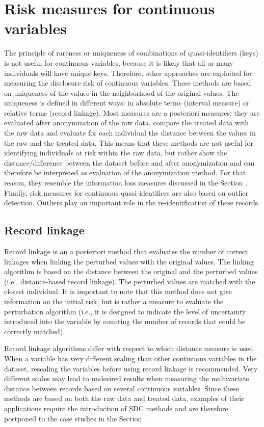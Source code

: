 \documentclass[letterpaper,10pt,english]{sphinxmanual}
\begin{document}
\section{Risk measures for continuous variables}
\label{\detokenize{measure_risk:risk-measures-for-continuous-variables}}
The principle of rareness or uniqueness of combinations of
quasi-identifiers (keys) is not useful for continuous variables, because
it is likely that all or many individuals will have unique keys.
Therefore, other approaches are exploited for measuring the disclosure
risk of continuous variables. These methods are based on uniqueness of
the values in the neighborhood of the original values. The uniqueness is
defined in different ways: in absolute terms (interval measure) or
relative terms (record linkage). Most measures are a posteriori
measures: they are evaluated after anonymization of the raw data,
compare the treated data with the raw data and evaluate for each
individual the distance between the values in the raw and the treated
data. This means that these methods are not useful for identifying
individuals at risk within the raw data, but rather show the
distance/difference between the dataset before and after anonymization
and can therefore be interpreted as evaluation of the anonymization
method. For that reason, they resemble the information loss measures
discussed in the Section .
Finally, risk measures for continuous
quasi-identifiers are also based on outlier detection. Outliers play an
important role in the re-identification of these records.


\subsection{Record linkage}
\label{\detokenize{measure_risk:record-linkage}}
Record linkage is an a posteriori method that evaluates the number of
correct linkages when linking the perturbed values with the original
values. The linking algorithm is based on the distance between the
original and the perturbed values (i.e., distance-based record linkage).
The perturbed values are matched with the closest individual. It is
important to note that this method does not give information on the
initial risk, but is rather a measure to evaluate the perturbation
algorithm (i.e., it is designed to indicate the level of uncertainty
introduced into the variable by counting the number of records that
could be correctly matched).

Record linkage algorithms differ with respect to which distance measure
is used. When a variable has very different scaling than other
continuous variables in the dataset, rescaling the variables before
using record linkage is recommended. Very different scales may lead to
undesired results when measuring the multivariate distance between
records based on several continuous variables. Since these methods are
based on both the raw data and treated data, examples of their
applications require the introduction of SDC methods and are therefore
postponed to the case studies in the Section .
\end{document}
